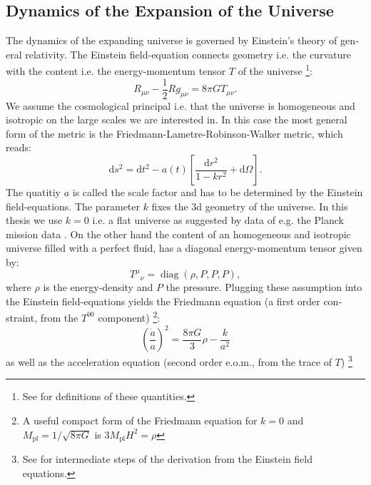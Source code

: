 \documentclass[master,       %
               twoside,        %
               BCOR10mm,       %
               english,ngerman, %
               ]{GAUBM}
\begin{document}
\begin{otherlanguage}{english}
\section{Dynamics of the Expansion of the Universe}
\label{sec:dynamics_of_the_examsion_of_the_universe}
The dynamics of the expanding universe is governed by Einstein's theory of general relativity. The Einstein field-equation connects geometry i.e. the curvature with the content i.e. the energy-momentum tensor $T$ of the universe \footnote{
See \cite{carroll_spacetime_and_geometry_2019} for definitions of these quantities.
}:
\begin{equation}
	R_{\mu \nu} - \frac{1}{2} R g_{\mu \nu} = 8 \pi G T_{\mu \nu}.
\end{equation}
We assume the cosmological principal i.e. that the universe is homogeneous and isotropic on the large scales we are interested in. In this case the most general form of the metric is the Friedmann-Lametre-Robinson-Walker metric, which reads:
\begin{equation}
	\mathrm{d} s^2 = \mathrm{d} t^2 - a(t) \left[ \frac{\mathrm{d} r^2}{1 - kr^2} + \mathrm{d} \Omega \right].
\end{equation}
The quatitiy $a$ is called the scale factor and has to be determined by the Einstein field-equations.
The parameter $k$ fixes the 3d geometry of the universe. In this thesis we use $k = 0$ i.e. a flat universe as suggested by data of e.g. the Planck mission data \cite{planck2018}.
On the other hand the content of an homogeneous and isotropic universe filled with a perfect fluid, has a diagonal energy-momentum tensor given by:
\begin{equation}
	T^\mu{}_\nu = \operatorname{diag}(\rho, P, P, P),
\end{equation}
where $\rho$ is the energy-density and $P$ the pressure.
Plugging these assumption into the Einstein field-equations yields the Friedmann equation (a first order constraint, from the $T^{00}$ component) \footnote{
A useful compact form of the Friedmann equation for $k = 0$ and $M_\mathrm{pl} = 1 / \sqrt{8 \pi G}$ is $3 M_\mathrm{pl} H^2 = \rho$
}:
\begin{equation}
	\label{eq:friedmann_equation}
	\boxed{
	\left( \frac{\dot{a}}{a} \right)^2 = \frac{8 \pi G}{3} \rho - \frac{k}{a^2}
	}
\end{equation}
as well as the acceleration equation (second order e.o.m., from the trace of $T$) \footnote{
See \cite[sec. 2.1, 3.1]{the_early_universe_kolb_and_turner} for intermediate steps of the derivation from the Einstein field equations.
}
\end{otherlanguage}
\end{document}
